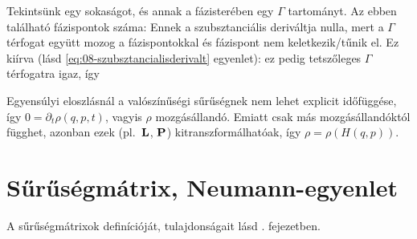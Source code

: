    Tekintsünk egy sokaságot, és annak a fázisterében egy $\Gamma$ tartományt. Az ebben található fázispontok száma:
   Ennek a szubsztanciális deriváltja nulla, mert a $\Gamma$ térfogat együtt mozog a fázispontokkal és fázispont nem keletkezik/tűnik el. Ez kiírva (lásd \eqref{eq:08-szubsztancialisderivalt} egyenlet):
   ez pedig tetszőleges $\Gamma$ térfogatra igaz, így 
   
   Egyensúlyi eloszlásnál a valószínűségi sűrűségnek nem lehet explicit időfüggése, így $0=\partial_t\rho(q,p,t)$, vagyis $\rho$ mozgásállandó. Emiatt csak más mozgásállandóktól függhet, azonban ezek (pl.\ $\mathbf{L}$, $\mathbf{P}$) kitranszformálhatóak, így $\rho=\rho(H(q,p))$. 
  
  
 \section{Sűrűségmátrix, Neumann-egyenlet}
  
  A sűrűségmátrixok definícióját, tulajdonságait lásd . fejezetben. 
  
